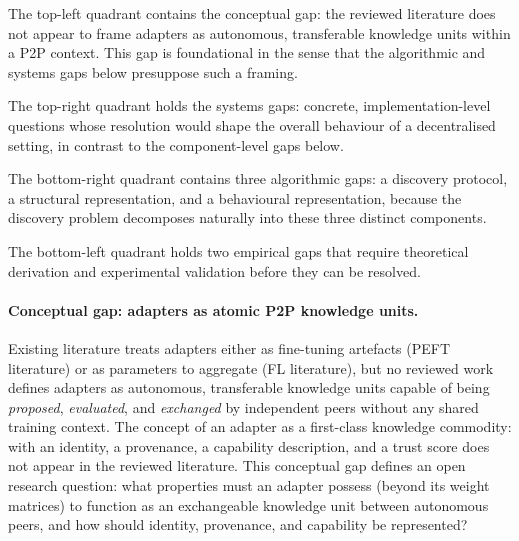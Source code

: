 The top-left quadrant contains the conceptual gap: the reviewed literature does not appear to frame adapters as autonomous, transferable knowledge units within a P2P context. This gap is foundational in the sense that the algorithmic and systems gaps below presuppose such a framing.

The top-right quadrant holds the systems gaps: concrete, implementation-level 
questions whose resolution would shape the overall behaviour of a decentralised setting, 
in contrast to the component-level gaps below.

The bottom-right quadrant contains three algorithmic gaps: a discovery protocol,
a structural representation, and a behavioural representation, because the
discovery problem decomposes naturally into these three distinct components.

The bottom-left quadrant holds two empirical gaps that require theoretical derivation
and experimental validation before they can be resolved.

\paragraph{Conceptual gap: adapters as atomic P2P knowledge units.}
Existing literature treats adapters either as fine-tuning artefacts (PEFT literature)
or as parameters to aggregate (FL literature), but no reviewed work defines adapters as autonomous, transferable knowledge units capable of being \textit{proposed}, \textit{evaluated}, and \textit{exchanged} by independent peers without any shared training context. The concept of an adapter as a first-class knowledge commodity: with an identity, a provenance, a capability description, and a trust score does not appear in the reviewed literature. This conceptual gap defines an open research question: what
properties must an adapter possess (beyond its weight matrices) to
function as an exchangeable knowledge unit between autonomous peers, and how
should identity, provenance, and capability be represented?

